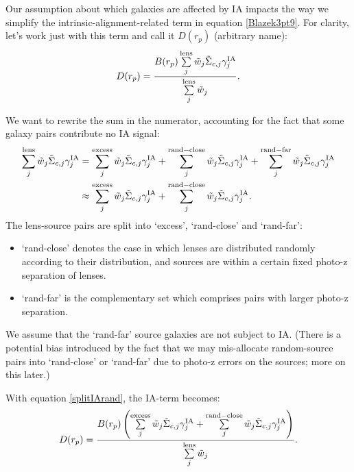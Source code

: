 \documentclass[onecolumn,amsmath,aps,fleqn, superscriptaddress]{revtex4}
\begin{document}
{Our assumption about which galaxies are affected by IA impacts the way we simplify the intrinsic-alignment-related term in equation \ref{Blazek3pt9}. For clarity, let's work just with this term and call it $D(r_p)$ (arbitrary name):
\begin{equation}
D(r_p) = \frac{B(r_p) \sum\limits_{j}^{\rm lens} \tilde{w}_j \tilde{\Sigma}_{c,j}\gamma^{\rm IA}_j }{\sum\limits_{j}^{\rm lens} \tilde{w}_j}.
\label{IAterm}
\end{equation}

We want to rewrite the sum in the numerator, accounting for the fact that some galaxy pairs contribute no IA signal:
\begin{align}
\sum\limits_{j}^{\rm lens} \tilde{w}_j \tilde{\Sigma}_{c,j} \gamma^{\rm IA}_j &= \sum\limits_{j}^{\rm excess} \tilde{w}_j \tilde{\Sigma}_{c,j} \gamma^{\rm IA}_j + \sum\limits_{j}^{\rm rand-close} \tilde{w}_j \tilde{\Sigma}_{c,j} \gamma^{\rm IA}_j + \sum\limits_{j}^{\rm rand-far} \tilde{w}_j \tilde{\Sigma}_{c,j} \gamma^{\rm IA}_j \nonumber \\ &\approx \sum\limits_{j}^{\rm excess} \tilde{w}_j \tilde{\Sigma}_{c,j} \gamma^{\rm IA}_j + \sum\limits_{j}^{\rm rand-close} \tilde{w}_j \tilde{\Sigma}_{c,j} \gamma^{\rm IA}_j.
\label{splitIArand}
\end{align}
The lens-source pairs are split into `excess', `rand-close' and `rand-far': 
\begin{itemize}
\item{`rand-close' denotes the case in which lenses are distributed randomly according to their distribution, and sources are within a certain fixed photo-z separation of lenses.} 
\item{`rand-far' is the complementary set which comprises pairs with larger photo-z separation.}
\end{itemize}
We assume that the `rand-far' source galaxies are not subject to IA. (There is a potential bias introduced by the fact that we may mis-allocate random-source pairs into `rand-close' or `rand-far' due to photo-z errors on the sources; more on this later.)

With equation \ref{splitIArand}, the IA-term becomes:
\begin{equation}
D(r_p) = \frac{B(r_p) \left(\sum\limits_{j}^{\rm excess} \tilde{w}_j \tilde{\Sigma}_{c,j} \gamma^{\rm IA}_j + \sum\limits_{j}^{\rm rand-close} \tilde{w}_j \tilde{\Sigma}_{c,j} \gamma^{\rm IA}_j\right)}{\sum\limits_{j}^{\rm lens} \tilde{w}_j}.
\label{IAterm_2}
\end{equation}

}
\end{document}
